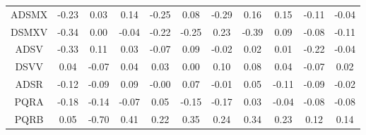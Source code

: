\begin{longtable}{ | c || c | c | c | c | c | c | c | c | c || c |}
ADSMX &  \cellcolor[HTML]{FFF7F7} -0.23 &  \cellcolor[HTML]{FFFFFF} 0.03 &  \cellcolor[HTML]{FFFFFF} 0.14 &  \cellcolor[HTML]{FFF7F7} -0.25 &  \cellcolor[HTML]{FFFFFF} 0.08 &  \cellcolor[HTML]{FFF7F7} -0.29 &  \cellcolor[HTML]{F7F7FF} 0.16 &  \cellcolor[HTML]{FFFFFF} 0.15 &  \cellcolor[HTML]{FFFFFF} -0.11 &  \cellcolor[HTML]{FFFFFF} -0.04 \\
DSMXV &  \cellcolor[HTML]{FFF7F7} -0.34 &  \cellcolor[HTML]{FFFFFF} 0.00 &  \cellcolor[HTML]{FFFFFF} -0.04 &  \cellcolor[HTML]{FFF7F7} -0.22 &  \cellcolor[HTML]{FFF7F7} -0.25 &  \cellcolor[HTML]{F7F7FF} 0.23 &  \cellcolor[HTML]{FFF7F7} -0.39 &  \cellcolor[HTML]{FFFFFF} 0.09 &  \cellcolor[HTML]{FFFFFF} -0.08 &  \cellcolor[HTML]{FFFFFF} -0.11 \\
ADSV &  \cellcolor[HTML]{FFF7F7} -0.33 &  \cellcolor[HTML]{FFFFFF} 0.11 &  \cellcolor[HTML]{FFFFFF} 0.03 &  \cellcolor[HTML]{FFFFFF} -0.07 &  \cellcolor[HTML]{FFFFFF} 0.09 &  \cellcolor[HTML]{FFFFFF} -0.02 &  \cellcolor[HTML]{FFFFFF} 0.02 &  \cellcolor[HTML]{FFFFFF} 0.01 &  \cellcolor[HTML]{FFF7F7} -0.22 &  \cellcolor[HTML]{FFFFFF} -0.04 \\
DSVV &  \cellcolor[HTML]{FFFFFF} 0.04 &  \cellcolor[HTML]{FFFFFF} -0.07 &  \cellcolor[HTML]{FFFFFF} 0.04 &  \cellcolor[HTML]{FFFFFF} 0.03 &  \cellcolor[HTML]{FFFFFF} 0.00 &  \cellcolor[HTML]{FFFFFF} 0.10 &  \cellcolor[HTML]{FFFFFF} 0.08 &  \cellcolor[HTML]{FFFFFF} 0.04 &  \cellcolor[HTML]{FFFFFF} -0.07 &  \cellcolor[HTML]{FFFFFF} 0.02 \\
ADSR &  \cellcolor[HTML]{FFFFFF} -0.12 &  \cellcolor[HTML]{FFFFFF} -0.09 &  \cellcolor[HTML]{FFFFFF} 0.09 &  \cellcolor[HTML]{FFFFFF} -0.00 &  \cellcolor[HTML]{FFFFFF} 0.07 &  \cellcolor[HTML]{FFFFFF} -0.01 &  \cellcolor[HTML]{FFFFFF} 0.05 &  \cellcolor[HTML]{FFFFFF} -0.11 &  \cellcolor[HTML]{FFFFFF} -0.09 &  \cellcolor[HTML]{FFFFFF} -0.02 \\
PQRA &  \cellcolor[HTML]{FFF7F7} -0.18 &  \cellcolor[HTML]{FFFFFF} -0.14 &  \cellcolor[HTML]{FFFFFF} -0.07 &  \cellcolor[HTML]{FFFFFF} 0.05 &  \cellcolor[HTML]{FFFFFF} -0.15 &  \cellcolor[HTML]{FFF7F7} -0.17 &  \cellcolor[HTML]{FFFFFF} 0.03 &  \cellcolor[HTML]{FFFFFF} -0.04 &  \cellcolor[HTML]{FFFFFF} -0.08 &  \cellcolor[HTML]{FFFFFF} -0.08 \\
PQRB &  \cellcolor[HTML]{FFFFFF} 0.05 &  \cellcolor[HTML]{FFEFEF} -0.70 &  \cellcolor[HTML]{F7F7FF} 0.41 &  \cellcolor[HTML]{F7F7FF} 0.22 &  \cellcolor[HTML]{F7F7FF} 0.35 &  \cellcolor[HTML]{F7F7FF} 0.24 &  \cellcolor[HTML]{F7F7FF} 0.34 &  \cellcolor[HTML]{F7F7FF} 0.23 &  \cellcolor[HTML]{FFFFFF} 0.12 &  \cellcolor[HTML]{FFFFFF} 0.14 \\

\end{longtable}

